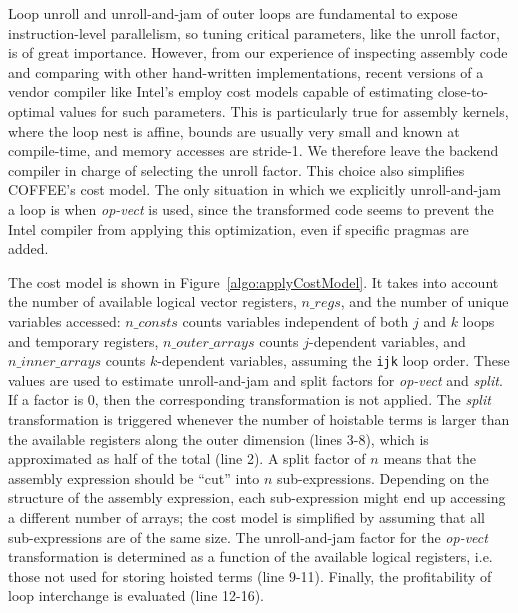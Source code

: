 \documentclass[conference]{IEEEtran}
\begin{document}
Loop unroll and unroll-and-jam of outer loops are fundamental to expose instruction-level parallelism, so tuning critical parameters, like the unroll factor, is of great importance. However, from our experience of inspecting assembly code and comparing with other hand-written implementations, recent versions of a vendor compiler like Intel's employ cost models capable of estimating close-to-optimal values for such parameters. This is particularly true for assembly kernels, where the loop nest is affine, bounds are usually very small and known at compile-time, and memory accesses are stride-1. We therefore leave the backend compiler in charge of selecting the unroll factor. This choice also simplifies COFFEE's cost model. The only situation in which we explicitly unroll-and-jam a loop is when \emph{op-vect} is used, since the transformed code seems to prevent the Intel compiler from applying this optimization, even if specific pragmas are added. 


The cost model is shown in Figure~\ref{algo:applyCostModel}. It takes into account the number of available logical vector registers, $n\_regs$, and the number of unique variables accessed: $n\_consts$ counts variables independent of both $j$ and $k$ loops and temporary registers, $n\_outer\_arrays$ counts $j$-dependent variables, and $n\_inner\_arrays$ counts $k$-dependent variables, assuming the \texttt{ijk} loop order. These values are used to estimate unroll-and-jam and split factors for \emph{op-vect} and \emph{split}. If a factor is 0, then the corresponding transformation is not applied. The \emph{split} transformation is triggered whenever the number of hoistable terms is larger than the available registers along the outer dimension (lines 3-8), which is approximated as half of the total (line 2). A split factor of $n$ means that the assembly expression should be ``cut'' into $n$ sub-expressions. Depending on the structure of the assembly expression, each sub-expression might end up accessing a different number of arrays; the cost model is simplified by assuming that all sub-expressions are of the same size. The unroll-and-jam factor for the \emph{op-vect} transformation is determined as a function of the available logical registers, i.e. those not used for storing hoisted terms (line 9-11). Finally, the profitability of loop interchange is evaluated (line 12-16).
\end{document}
